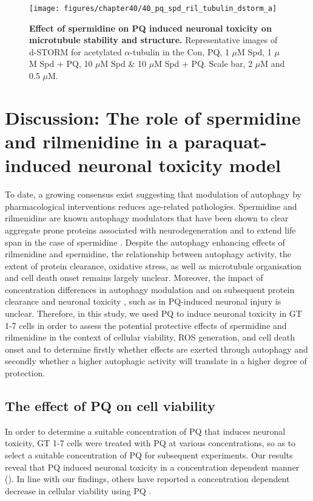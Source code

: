 \begin{landscape}
\begin{figure}[!htbp]
\center
  \texttt{[image: figures/chapter40/40\_pq\_spd\_ril\_tubulin\_dstorm\_a]}
  \caption[Effect of spermidine on PQ induced neuronal toxicity on microtubule stability and structure]{\textbf{Effect of spermidine on PQ induced neuronal toxicity on microtubule stability and structure.} Representative images of d-STORM for acetylated $\alpha$-tubulin in the Con, PQ, 1 $\mu$M Spd, 1 $\mu$M Spd + PQ, 10 $\mu$M Spd \& 10 $\mu$M Spd + PQ. Scale bar, 2 $\mu$M and 0.5 $\mu$M.}
  \label{fig:40_pq_spd_ril_tubulin_dstorm_a}
\end{figure} 
\end{landscape}


\section{Discussion: The role of spermidine and rilmenidine in a paraquat-induced neuronal toxicity model}

To date, a growing consensus exist suggesting that modulation of autophagy by pharmacological interventions reduces age-related pathologies. Spermidine and rilmenidine are known autophagy modulators that have been shown to clear aggregate prone proteins associated with neurodegeneration \citep{Bhukel2017,Buttner2014,Rose2010,Sigrist2014} and to extend life span in the case of spermidine \citep{Madeo2010,Morselli2009}. Despite the autophagy enhancing effects of rilmenidine and spermidine, the relationship between autophagy activity, the extent of protein clearance, oxidative stress, as well as microtubule organisation and cell death onset remains largely unclear. Moreover, the impact of concentration differences in autophagy modulation and on subsequent protein clearance and neuronal toxicity , such as in PQ-induced neuronal injury is unclear. Therefore, in this study, we used PQ to induce neuronal toxicity in GT 1-7 cells in order to assess the potential protective effects of spermidine and rilmenidine in the context of cellular viability, ROS generation, and cell death onset and to determine firstly whether effects are exerted through autophagy and secondly whether a higher autophagic activity will translate in a higher degree of protection. 

\subsection{ The effect of PQ on cell viability}
In order to determine a suitable concentration of PQ that induces neuronal toxicity, GT 1-7 cells were treated with PQ at various concentrations, so as to select a suitable concentration of PQ for subsequent experiments. Our results reveal that PQ induced neuronal toxicity in a concentration dependent manner (). In line with our findings, others have reported a concentration dependent decrease in cellular viability using PQ \citep{Chen2012b,Jaroonwitchawan2017,Mehdi2013}. 

